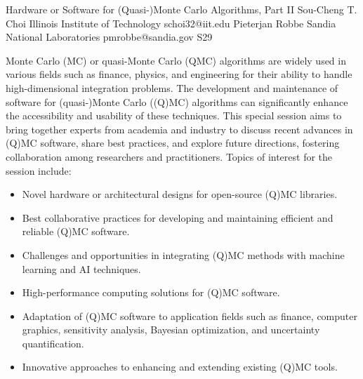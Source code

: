 

\clearpage

\begin{session}
 {Hardware or Software for (Quasi-)Monte Carlo Algorithms, Part II}%
 {Sou-Cheng T. Choi}%
 {Illinois Institute of Technology}%
 {schoi32@iit.edu}%
 {Pieterjan Robbe}%
 {Sandia National Laboratories}%
 {pmrobbe@sandia.gov}%
 {S29}%
 {}%

 Monte Carlo (MC) or quasi-Monte Carlo (QMC) algorithms are widely used in various fields such as finance, physics, and engineering for their ability to handle high-dimensional integration problems. The development and maintenance of software for (quasi-)Monte Carlo ((Q)MC) algorithms can significantly enhance the accessibility and usability of these techniques. This special session aims to bring together experts from academia and industry to discuss recent advances in (Q)MC software, share best practices, and explore future directions, fostering collaboration among researchers and practitioners.
 Topics of interest for the session include:
 \begin{itemize}
 \item Novel hardware or architectural designs for open-source (Q)MC libraries.
 \item Best collaborative practices for developing and maintaining efficient and reliable (Q)MC software.
 \item Challenges and opportunities in integrating (Q)MC methods with machine learning and AI techniques.
 \item High-performance computing solutions for (Q)MC software.
 \item Adaptation of (Q)MC software to application fields such as finance, computer graphics, sensitivity analysis, Bayesian optimization, and uncertainty quantification.
 \item Innovative approaches to enhancing and extending existing (Q)MC tools.
 \end{itemize}
\end{session}



